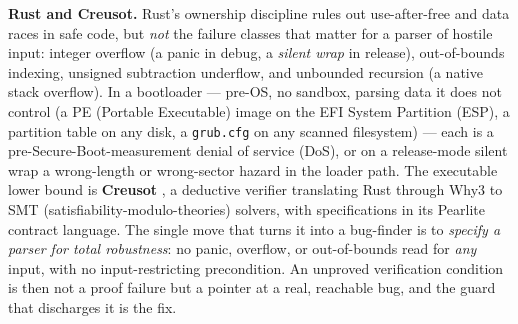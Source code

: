 \documentclass[11pt]{article}
\newcommand{\code}[1]{\texttt{#1}}
\begin{document}
\textbf{Rust and Creusot.} Rust's ownership discipline rules out use-after-free and data races
in safe code, but \emph{not} the failure classes that matter for a parser of hostile input:
integer overflow (a panic in debug, a \emph{silent wrap} in release), out-of-bounds indexing,
unsigned subtraction underflow, and unbounded recursion (a native stack overflow). In a
bootloader --- pre-OS, no sandbox, parsing data it does not control (a PE (Portable Executable)
image on the EFI System Partition (ESP), a partition table on any disk, a \code{grub.cfg} on any
scanned filesystem)
--- each is a pre-Secure-Boot-measurement denial of service (DoS), or on a release-mode silent wrap a
wrong-length or wrong-sector hazard in the loader path. The executable lower bound is
\textbf{Creusot} \citep{denis2022creusot}, a deductive verifier translating Rust through Why3
\citep{filliatre2013why3} to SMT (satisfiability-modulo-theories) solvers, with specifications in its Pearlite contract language.
The single move that turns it into a bug-finder is to \emph{specify a parser for total
robustness}: no panic, overflow, or out-of-bounds read for \emph{any} input, with no
input-restricting precondition. An unproved verification condition is then not a proof failure
but a pointer at a real, reachable bug, and the guard that discharges it is the fix.
\end{document}
